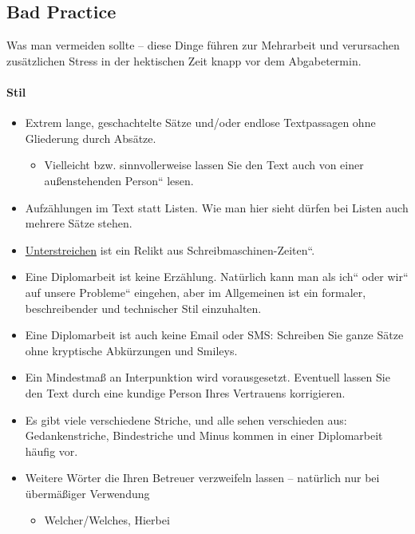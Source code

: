 \subsection{Bad Practice}

Was man vermeiden sollte -- diese Dinge führen zur Mehrarbeit und
verursachen zusätzlichen Stress in der hektischen Zeit knapp vor dem
Abgabetermin.


\paragraph{Stil}
\begin{itemize}
\item Extrem lange, geschachtelte Sätze und/oder endlose Textpassagen ohne
Gliederung durch Absätze.\nopagebreak

\begin{itemize}
\item Vielleicht bzw. sinnvollerweise lassen Sie den Text auch von einer
\quotedblbase außenstehenden Person`` lesen. 
\end{itemize}
\item Aufzählungen im Text statt Listen. Wie man hier sieht dürfen bei Listen
auch mehrere Sätze stehen.
\item \uline{Unterstreichen} ist ein Relikt aus \quotedblbase Schreibmaschinen-Zeiten``.
\item Eine Diplomarbeit ist keine Erzählung. Natürlich kann man als \quotedblbase ich``
oder \quotedblbase wir`` auf \quotedblbase unsere Probleme`` eingehen,
aber im Allgemeinen ist ein formaler, beschreibender und technischer
Stil einzuhalten.
\item Eine Diplomarbeit ist auch keine Email oder SMS: Schreiben Sie ganze
Sätze ohne kryptische Abkürzungen und Smileys.
\item Ein Mindestmaß an Interpunktion wird vorausgesetzt. Eventuell lassen
Sie den Text durch eine kundige Person Ihres Vertrauens korrigieren.
\item Es gibt viele verschiedene Striche, und alle sehen verschieden aus:
Gedankenstriche, Bindestriche und Minus kommen in einer Diplomarbeit
häufig vor.
\item Weitere Wörter die Ihren Betreuer verzweifeln lassen -- natürlich
nur bei übermäßiger Verwendung

\begin{itemize}
\item Welcher/Welches, Hierbei
\end{itemize}
\end{itemize}

